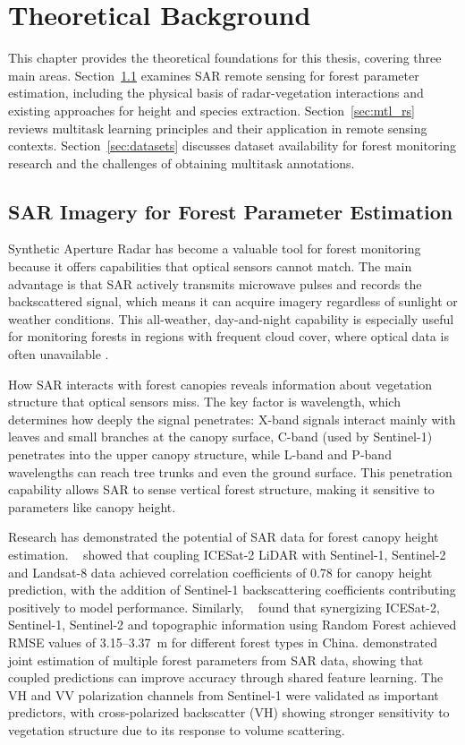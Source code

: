 \chapter{Theoretical Background}
\label{chap:background}

This chapter provides the theoretical foundations for this thesis, covering three main areas. Section~\ref{sec:sar_forest} examines SAR remote sensing for forest parameter estimation, including the physical basis of radar-vegetation interactions and existing approaches for height and species extraction. Section~\ref{sec:mtl_rs} reviews multitask learning principles and their application in remote sensing contexts. Section~\ref{sec:datasets} discusses dataset availability for forest monitoring research and the challenges of obtaining multitask annotations.

\section{SAR Imagery for Forest Parameter Estimation}
\label{sec:sar_forest}

Synthetic Aperture Radar has become a valuable tool for forest monitoring because it offers capabilities that optical sensors cannot match. The main advantage is that SAR actively transmits microwave pulses and records the backscattered signal, which means it can acquire imagery regardless of sunlight or weather conditions. This all-weather, day-and-night capability is especially useful for monitoring forests in regions with frequent cloud cover, where optical data is often unavailable \cite{moreira_tutorial_2013}.

How SAR interacts with forest canopies reveals information about vegetation structure that optical sensors miss. The key factor is wavelength, which determines how deeply the signal penetrates: X-band signals interact mainly with leaves and small branches at the canopy surface, C-band (used by Sentinel-1) penetrates into the upper canopy structure, while L-band and P-band wavelengths can reach tree trunks and even the ground surface. This penetration capability allows SAR to sense vertical forest structure, making it sensitive to parameters like canopy height.

Research has demonstrated the potential of SAR data for forest canopy height estimation. ~\cite{li_high-resolution_2020} showed that coupling ICESat-2 LiDAR with Sentinel-1, Sentinel-2 and Landsat-8 data achieved correlation coefficients of 0.78 for canopy height prediction, with the addition of Sentinel-1 backscattering coefficients contributing positively to model performance. Similarly, ~\cite{wei_forest_2024} found that synergizing ICESat-2, Sentinel-1, Sentinel-2 and topographic information using Random Forest achieved RMSE values of 3.15--3.37~m for different forest types in China. \cite{srivastava_joint_2017} demonstrated joint estimation of multiple forest parameters from SAR data, showing that coupled predictions can improve accuracy through shared feature learning. The VH and VV polarization channels from Sentinel-1 were validated as important predictors, with cross-polarized backscatter (VH) showing stronger sensitivity to vegetation structure due to its response to volume scattering.

